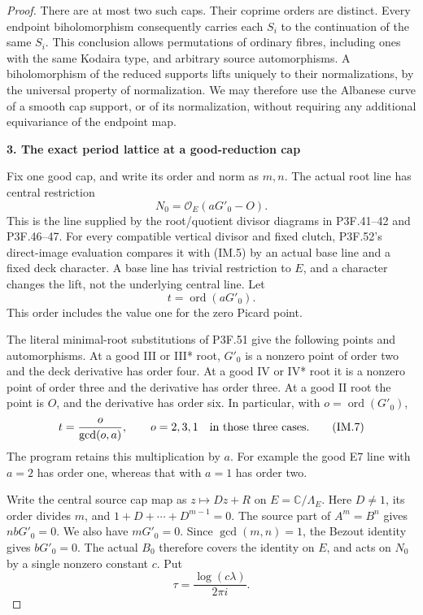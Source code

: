 \begin{proof}
There are at most two such caps. Their coprime orders are distinct.
Every endpoint biholomorphism consequently carries each \(S_i\)
to the continuation of the same \(S_i\). This conclusion allows
permutations of ordinary fibres, including ones with the same Kodaira
type, and arbitrary source automorphisms. A biholomorphism of the
reduced supports lifts uniquely to their normalizations, by the
universal property of normalization. We may therefore use the
Albanese curve of a smooth cap support, or of its normalization,
without requiring any additional equivariance of the endpoint map.

\par

\medskip\noindent\textbf{3. The exact period lattice at a good-reduction cap}

\par\nobreak

Fix one good cap, and write its order and norm as \(m,n\).
The actual root line has central restriction
\[
                          N_0=\mathcal O_E(aG'_0-O).
                                                               \tag{IM.5}
\]
This is the line supplied by the root/quotient divisor diagrams in
P3F.41--42 and P3F.46--47. For every compatible vertical divisor
and fixed clutch, P3F.52's direct-image evaluation compares it with
(IM.5) by an actual base line and a fixed deck character. A base
line has trivial restriction to \(E\), and a character changes
the lift, not the underlying central line. Let
\[
                         t=\operatorname{ord}(aG'_0).
                                                               \tag{IM.6}
\]
This order includes the value one for the zero Picard point.

The literal minimal-root substitutions of P3F.51 give the following
points and automorphisms. At a good III or III* root, \(G'_0\)
is a nonzero point of order two and the deck derivative has order
four. At a good IV or IV* root it is a nonzero point of order three
and the derivative has order three. At a good II root the point
is \(O\), and the derivative has order six. In particular, with
\(o=\operatorname{ord}(G'_0)\),
\[
  t=\frac{o}{\gcd(o,a)},\qquad
  o=2,3,1\quad\hbox{in those three cases}.             \tag{IM.7}
\]
The program retains this multiplication by \(a\). For example the
good E7 line with \(a=2\) has order one, whereas that with \(a=1\)
has order two.

Write the central source cap map as \(z\mapsto Dz+R\) on
\(E=\mathbb C/\Lambda_E\). Here \(D\ne1\), its order divides
\(m\), and \(1+D+\cdots+D^{m-1}=0\). The source part of
\(A^m=B^n\) gives \(nbG'_0=0\). We also have \(mG'_0=0\).
Since \(\gcd(m,n)=1\), the Bezout identity gives \(bG'_0=0\).
The actual \(B_0\) therefore covers the identity on \(E\), and
acts on \(N_0\) by a single nonzero constant \(c\). Put
\[
                  \tau=\frac{\log(c\lambda)}{2\pi i}.
                                                               \tag{IM.8}
\]


\end{proof}
